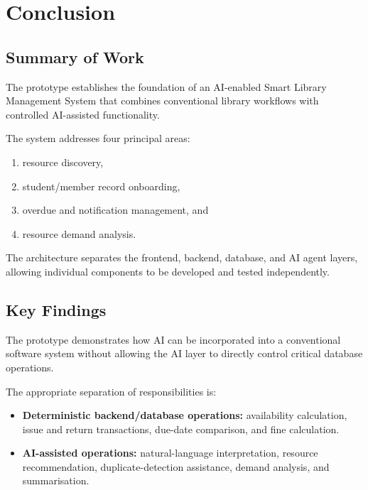 \documentclass{tietreport}
\begin{document}

\chapter{Conclusion}

\section{Summary of Work}

The prototype establishes the foundation of an AI-enabled Smart Library
Management System that combines conventional library workflows with
controlled AI-assisted functionality.

The system addresses four principal areas:

\begin{enumerate}

    \item resource discovery,

    \item student/member record onboarding,

    \item overdue and notification management, and

    \item resource demand analysis.

\end{enumerate}

The architecture separates the frontend, backend, database, and AI agent
layers, allowing individual components to be developed and tested
independently.

\section{Key Findings}

The prototype demonstrates how AI can be incorporated into a conventional
software system without allowing the AI layer to directly control critical
database operations.

The appropriate separation of responsibilities is:

\begin{itemize}

    \item \textbf{Deterministic backend/database operations:}
    availability calculation, issue and return transactions, due-date
    comparison, and fine calculation.

    \item \textbf{AI-assisted operations:}
    natural-language interpretation, resource recommendation,
    duplicate-detection assistance, demand analysis, and summarisation.

\end{itemize}
\end{document}
